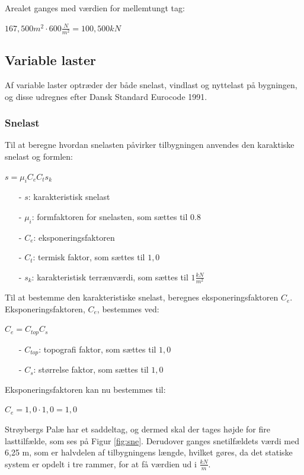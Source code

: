 Arealet ganges med værdien for mellemtungt tag:
\begin{center}
	$167,\!500 m^2\cdot 600 \frac{N}{m^2}=100,\!500 kN$
\end{center}

\subsection{Variable laster}
Af variable laster optræder der både snelast, vindlast og nyttelast på bygningen, og disse udregnes efter Dansk Standard Eurocode 1991.

\subsubsection{Snelast}
Til at beregne hvordan snelasten påvirker tilbygningen anvendes den karaktiske snelast og formlen:
\begin{center}
$s=\mu_iC_eC_ts_k$
\end{center}
\begin{itemize}
	\item[-] $s$: karakteristisk snelast
	\item[-] $\mu_i$: formfaktoren for snelasten, som sættes til 0.8 \citep[ tabel 5.2 kapitel 5.3]{EU91}
	\item[-] $C_e$: eksponeringsfaktoren
	\item[-] $C_t$: termisk faktor, som sættes til $1,\!0$ \citep[ kapitel 5.2]{EU91}
	\item[-] $s_k$: karakteristisk terrænværdi, som sættes til $1 \frac{kN}{m^2}$ \citep[ kapitel 4.1]{EU91}
\end{itemize}
Til at bestemme den karakteristiske snelast, beregnes eksponeringsfaktoren $C_e$.
\newline
\newline
Eksponeringsfaktoren, $C_e$, bestemmes ved:
\begin{center}
$C_e=C_{top}C_s$
\end{center}
\begin{itemize}
	\item[-] $C_{top}$: topografi faktor, som sættes til $1,\!0$ \citep[ tabel 5.1 kapitel 5.2]{EU91}
	\item[-] $C_s$: størrelse faktor, som sættes til $1,\!0$ \citep[ kapitel 5.2]{EU91}
\end{itemize}
Eksponeringsfaktoren kan nu bestemmes til:
\begin{center}
$C_e=1,\!0\cdot 1,\!0=1,\!0$
\end{center}
Strøybergs Palæ har et saddeltag, og dermed skal der tages højde for fire lasttilfælde, som ses på Figur \ref{fig:sne}. Derudover ganges snetilfældets værdi med 6,25 m, som er halvdelen af tilbygningens længde, hvilket gøres, da det statiske system er opdelt i tre rammer, for at få værdien ud i $\frac{kN}{m}$.


